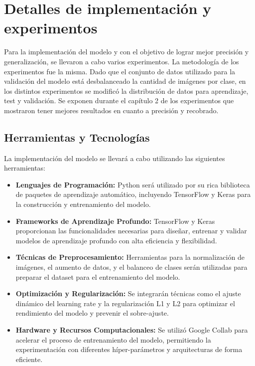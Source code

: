 \chapter{Detalles de implementación y experimentos}\label{chapter:implementation}

Para la implementación del modelo y con el objetivo de lograr mejor precisión y generalización, se llevaron a cabo varios experimentos. La metodología de los experimentos fue la misma. Dado que el conjunto de datos utilizado para la validación del modelo está desbalanceado la cantidad de imágenes por clase, en los distintos experimentos se modificó la distribución de datos para aprendizaje, test y validación. Se exponen durante el capítulo 2 de los experimentos que mostraron tener mejores resultados en cuanto a precisión y recobrado. 

\section{Herramientas y Tecnologías}

La implementación del modelo se llevará a cabo utilizando las siguientes herramientas:

\begin{itemize}
    \item \textbf{Lenguajes de Programación:} Python será utilizado por su rica biblioteca de paquetes de aprendizaje automático, incluyendo TensorFlow y Keras para la construcción y entrenamiento del modelo.
    \item \textbf{Frameworks de Aprendizaje Profundo:} TensorFlow y Keras proporcionan las funcionalidades necesarias para diseñar, entrenar y validar modelos de aprendizaje profundo con alta eficiencia y flexibilidad.
    \item \textbf{Técnicas de Preprocesamiento:} Herramientas para la normalización de imágenes, el aumento de datos, y el balanceo de clases serán utilizadas para preparar el dataset para el entrenamiento del modelo.
    \item \textbf{Optimización y Regularización:} Se integrarán técnicas como el ajuste dinámico del learning rate y la regularización L1 y L2 para optimizar el rendimiento del modelo y prevenir el sobre-ajuste.
    \item \textbf{Hardware y Recursos Computacionales:} Se utilizó Google Collab para acelerar el proceso de entrenamiento del modelo, permitiendo la experimentación con diferentes híper-parámetros y arquitecturas de forma eficiente.
\end{itemize}

